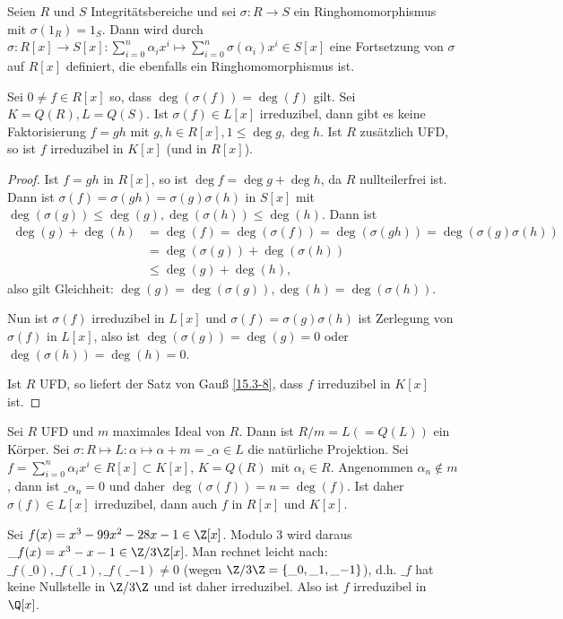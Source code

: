 \begin{st}[Reduktionskriterium] \label{15.3-12}
	Seien $R$ und $S$ Integritätsbereiche und sei $\sigma: R \to S$ ein Ringhomomorphismus mit $\sigma(1_R) = 1_S$.
	Dann wird durch $\sigma: R[x] \to S[x] : \sum_{i=0}^n \alpha_i x^i \mapsto \sum_{i=0}^n \sigma(\alpha_i) x^i \in S[x]$ eine Fortsetzung von $\sigma$ auf $R[x]$ definiert, die ebenfalls ein Ringhomomorphismus ist.

	Sei $0 \neq f \in R[x]$ so, dass $\deg(\sigma(f)) = \deg(f)$ gilt.
	Sei $K = Q(R), L = Q(S)$.
	Ist $\sigma(f) \in L[x]$ irreduzibel, dann gibt es keine Faktorisierung $f = gh$ mit $g, h \in R[x], 1 \le \deg g, \deg h$.
	Ist $R$ zusätzlich UFD, so ist $f$ irreduzibel in $K[x]$ (und in $R[x]$).
	\begin{proof}
		Ist $f = gh$ in $R[x]$, so ist $\deg f = \deg g + \deg h$, da $R$ nullteilerfrei ist.
		Dann ist $\sigma(f) = \sigma(gh) = \sigma(g)\sigma(h)$ in $S[x]$ mit $\deg(\sigma(g)) \le \deg(g), \deg(\sigma(h)) \le \deg(h)$.
		Dann ist
		\begin{align*}
			\deg(g) + \deg(h)
			&= \deg(f)
			= \deg(\sigma(f))
			= \deg(\sigma(gh))
			= \deg(\sigma(g)\sigma(h)) \\
			&= \deg(\sigma(g)) + \deg(\sigma(h)) \\
			&\le \deg(g) + \deg(h),
		\end{align*}
		also gilt Gleichheit: $\deg(g) = \deg(\sigma(g)), \deg(h) = \deg(\sigma(h))$.

		Nun ist $\sigma(f)$ irreduzibel in $L[x]$ und $\sigma(f) = \sigma(g)\sigma(h)$ ist Zerlegung von $\sigma(f)$ in $L[x]$, also ist $\deg(\sigma(g)) = \deg(g) = 0$ oder $\deg(\sigma(h)) = \deg(h) = 0$.

		Ist $R$ UFD, so liefert der Satz von Gauß \ref{15.3-8}, dass $f$ irreduzibel in $K[x]$ ist.
	\end{proof}
\end{st}

\begin{ex} \label{15.3-13}
	Sei $R$ UFD und $m$ maximales Ideal von $R$.
	Dann ist $R / m = L (= Q(L))$ ein Körper.
	Sei $\sigma: R \mapsto L: \alpha \mapsto \alpha + m = \_\alpha \in L$ die natürliche Projektion.
	Sei $f = \sum_{i=0}^n \alpha_i x^i \in R[x] \subset K[x]$, $K = Q(R)$ mit $\alpha_i \in R$.
	Angenommen $\alpha_n \not\in m$, dann ist $\_{\alpha_n} = 0$ und daher $\deg(\sigma(f)) = n = \deg(f)$.
	Ist daher $\sigma(f) \in L[x]$ irreduzibel, dann auch $f$ in $R[x]$ und $K[x]$.
	\begin{ex*}
		Sei $f(x) = x^3 - 99x^2 - 28x - 1 \in \Z[x]$.
		Modulo 3 wird daraus $\_f(x) = x^3 - x - 1 \in \Z / 3\Z[x]$.
		Man rechnet leicht nach: $\_f(\_0), \_f(\_1), \_f(\_{-1}) \neq 0$ (wegen $\Z / 3\Z = \{\_0, \_1, \_{-1}\}$), d.h. $\_f$ hat keine Nullstelle in $\Z / 3\Z$ und ist daher irreduzibel.
		Also ist $f$ irreduzibel in $\Q[x]$.
	\end{ex*}
\end{ex}

